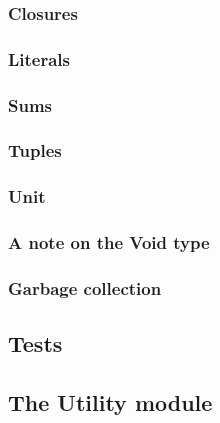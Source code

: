 \documentclass[12pt]{article}
\begin{document}
\subsubsection{Closures}
\subsubsection{Literals}
\subsubsection{Sums}
\subsubsection{Tuples}
\subsubsection{Unit}
\subsubsection{A note on the Void type}
\subsubsection{Garbage collection}

\subsection{Tests}
\subsection{The Utility module}
\end{document}
